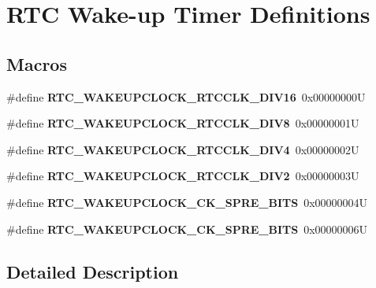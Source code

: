 \hypertarget{group___r_t_c_ex___wakeup___timer___definitions}{}\section{R\+TC Wake-\/up Timer Definitions}
\label{group___r_t_c_ex___wakeup___timer___definitions}
\subsection*{Macros}
\begin{DoxyCompactItemize}
\item 
\mbox{\label{group___r_t_c_ex___wakeup___timer___definitions_ga3864a5d628a34118dfcc86e9b8958e51}} 
\#define {\bfseries R\+T\+C\+\_\+\+W\+A\+K\+E\+U\+P\+C\+L\+O\+C\+K\+\_\+\+R\+T\+C\+C\+L\+K\+\_\+\+D\+I\+V16}~0x00000000U
\item 
\mbox{\label{group___r_t_c_ex___wakeup___timer___definitions_gaaa4ec1d6b96e88b070899d0dd5d8869f}} 
\#define {\bfseries R\+T\+C\+\_\+\+W\+A\+K\+E\+U\+P\+C\+L\+O\+C\+K\+\_\+\+R\+T\+C\+C\+L\+K\+\_\+\+D\+I\+V8}~0x00000001U
\item 
\mbox{\label{group___r_t_c_ex___wakeup___timer___definitions_gade098ac6e923b02c06de003f61aafd2c}} 
\#define {\bfseries R\+T\+C\+\_\+\+W\+A\+K\+E\+U\+P\+C\+L\+O\+C\+K\+\_\+\+R\+T\+C\+C\+L\+K\+\_\+\+D\+I\+V4}~0x00000002U
\item 
\mbox{\label{group___r_t_c_ex___wakeup___timer___definitions_gab1013526c00cfab26015267f17b6553f}} 
\#define {\bfseries R\+T\+C\+\_\+\+W\+A\+K\+E\+U\+P\+C\+L\+O\+C\+K\+\_\+\+R\+T\+C\+C\+L\+K\+\_\+\+D\+I\+V2}~0x00000003U
\item 
\mbox{\label{group___r_t_c_ex___wakeup___timer___definitions_ga2d75cf962faf3257ada7f102fccfcb62}} 
\#define {\bfseries R\+T\+C\+\_\+\+W\+A\+K\+E\+U\+P\+C\+L\+O\+C\+K\+\_\+\+C\+K\+\_\+\+S\+P\+R\+E\+\_\+B\+I\+TS}~0x00000004U
\item 
\mbox{\label{group___r_t_c_ex___wakeup___timer___definitions_gab4ff75ad48550530f95698f269a617dd}} 
\#define {\bfseries R\+T\+C\+\_\+\+W\+A\+K\+E\+U\+P\+C\+L\+O\+C\+K\+\_\+\+C\+K\+\_\+\+S\+P\+R\+E\+\_\+B\+I\+TS}~0x00000006U
\end{DoxyCompactItemize}


\subsection{Detailed Description}
